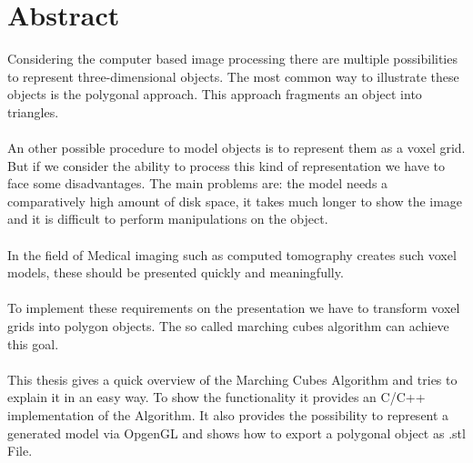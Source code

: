 \chapter{Abstract}

Considering the computer based image processing there are multiple possibilities to represent three-dimensional objects. The most common way to illustrate these objects is the polygonal approach. This approach fragments an object into triangles.
\\\\
An other possible procedure to model objects is to represent them as a voxel grid. But if we consider the ability to process this kind of representation we have to face some disadvantages. The main problems are: the model needs a comparatively high amount of disk space, it takes much longer to show the image and it is difficult to perform manipulations on the object.
\\\\
In the field of Medical imaging such as computed tomography creates such voxel models, these should be presented quickly and meaningfully.
\\\\
To implement these requirements on the presentation we have to transform voxel grids into polygon objects. The so called marching cubes algorithm can achieve this goal.
\\\\
This thesis gives a quick overview of the Marching Cubes Algorithm and tries to explain it in an easy way. To show the functionality it provides an C/C++ implementation of the Algorithm. It also provides the possibility to represent a generated model via OpgenGL and shows how to export a polygonal object as .stl File.